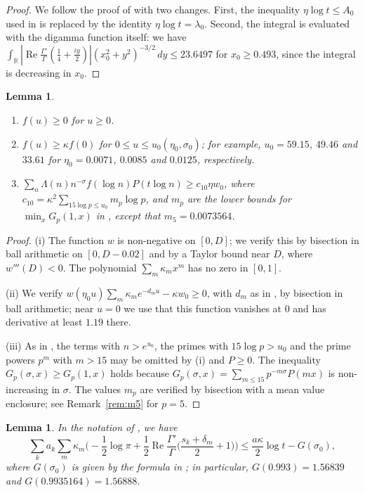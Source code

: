 \documentclass[11pt]{amsart}
\numberwithin{equation}{section}
\newtheorem{lemma}[theorem]{Lemma}
\theoremstyle{definition}
\theoremstyle{remark}
\newcommand{\Rp}{\operatorname{Re}}
\begin{document}
\begin{proof}
We follow the proof of \cite[Lemma~8]{BTY} with two changes.
First, the inequality $\eta\log t \leq A_0$ used in \cite[(33)]{BTY} is replaced by the identity $\eta\log t = \lambda_0$.
Second, the integral \cite[(32)]{BTY} is evaluated with the digamma function itself: we have $\int_{\mathbb R}|\Rp\frac{\Gamma'}{\Gamma}(\frac14 + \frac{iy}2)|(x_0^2 + y^2)^{-3/2}\,dy \leq 23.6497$ for $x_0 \geq 0.493$, since the integral is decreasing in $x_0$.
\end{proof}

\begin{lemma}\label{lem:L1011}
\begin{enumerate}
\item[(i)] $f(u) \geq 0$ for $u \geq 0$.
\item[(ii)] $f(u) \geq \kappa f(0)$ for $0 \leq u \leq u_0(\eta_0, \sigma_0)$; for example, $u_0 = 59.15$, $49.46$ and $33.61$ for $\eta_0 = 0.0071$, $0.0085$ and $0.0125$, respectively.
\item[(iii)] $\sum_n\Lambda(n)n^{-\sigma}f(\log n)P(t\log n) \geq c_{10}\eta w_0$, where $c_{10} = \kappa^2\sum_{15\log p\leq u_0}m_p\log p$, and $m_p$ are the lower bounds for $\min_xG_p(1,x)$ in \cite[Table~1]{BTY}, except that $m_5 = 0.0073564$.
\end{enumerate}
\end{lemma}

\begin{proof}
(i) The function $w$ is non-negative on $[0, D]$; we verify this by bisection in ball arithmetic on $[0, D - 0.02]$ and by a Taylor bound near $D$, where $w'''(D) < 0$.
The polynomial $\sum_m\kappa_mx^m$ has no zero in $[0,1]$.

(ii) We verify $w(\eta_0u)\sum_m\kappa_me^{-d_mu} - \kappa w_0 \geq 0$, with $d_m$ as in \cite[Lemma~11]{BTY}, by bisection in ball arithmetic; near $u = 0$ we use that this function vanishes at $0$ and has derivative at least $1.19$ there.

(iii) As in \cite[Lemma~10]{BTY}, the terms with $n > e^{u_0}$, the primes with $15\log p > u_0$ and the prime powers $p^m$ with $m > 15$ may be omitted by (i) and $P \geq 0$.
The inequality $G_p(\sigma, x) \geq G_p(1, x)$ holds because $G_p(\sigma, x) = \sum_{m\leq15}p^{-m\sigma}P(mx)$ is non-increasing in $\sigma$.
The values $m_p$ are verified by bisection with a mean value enclosure; see Remark~\ref{rem:m5} for $p = 5$.
\end{proof}

\begin{lemma}\label{lem:L12}
In the notation of \cite[Lemma~12]{BTY}, we have
\[
\sum_ka_k\sum_m\kappa_m\Big(-\frac12\log\pi + \frac12\Rp\frac{\Gamma'}{\Gamma}\Big(\frac{s_k + \delta_m}{2} + 1\Big)\Big) \leq \frac{a\kappa}2\log t - G(\sigma_0),
\]
where $G(\sigma_0)$ is given by the formula in \cite{BTY}; in particular, $G(0.993) = 1.56839$ and $G(0.9935164) = 1.56888$.
\end{lemma}
\end{document}

